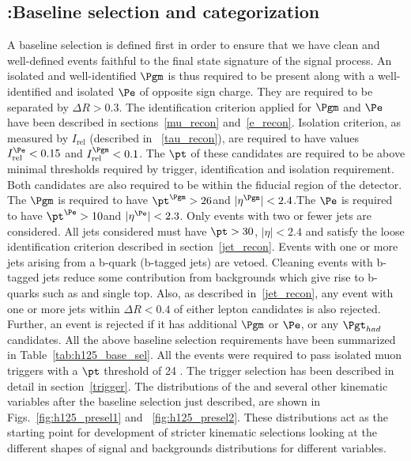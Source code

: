 \subsection{\hmue:Baseline selection and categorization}
\label{h125_presel_cat}
A baseline selection is defined first in order to ensure that we have clean and well-defined events faithful to the final state signature of the signal process. An isolated and well-identified $\Pgm$ is thus required to be present along with a well-identified and isolated $\Pe$ of opposite sign charge. They are required to be separated by $\Delta R > 0.3$. The identification criterion applied for $\Pgm$ and $\Pe$ have been described in sections~\ref{mu_recon} and~\ref{e_recon}. Isolation criterion, as measured by $I_\text{rel}$ (described in ~\ref{tau_recon}), are required to have values $I_\text{rel}^{\Pe} < 0.15$ and $I_\text{rel}^{\Pgm} < 0.1$. The $\pt$ of these candidates are required to be above minimal thresholds required by trigger, identification and isolation requirement. Both candidates are also required to be within the fiducial region of the detector. The $\Pgm$ is required to have $\pt^{\Pgm} > 26$\GeV and $|\eta^{\Pgm}|<2.4$.The $\Pe$ is required to have $\pt^{\Pe} > 10$\GeV and $|\eta^{\Pe}|<2.3$. Only events with two or fewer jets are considered. All jets considered must have $\pt>30$\GeV, $|\eta| < 2.4 $ and satisfy the loose identification criterion described in section~\ref{jet_recon}. Events with one or more jets arising from a b-quark (b-tagged jets) are vetoed. Cleaning events with b-tagged jets reduce some contribution from backgrounds which give rise to b-quarks such as \ttb and single top. Also, as described in~\ref{jet_recon}, any event with one or more jets within $\Delta R < 0.4$ of either lepton candidates is also rejected. Further, an event is rejected if it has additional $\Pgm$ or $\Pe$, or any $\Pgt_{had}$ candidates. All the above baseline selection requirements have been summarized in Table~\ref{tab:h125_base_sel}. All the events were required to pass isolated muon triggers with a $\pt$ threshold of 24 \GeV. The trigger selection has been described in detail in section~\ref{trigger}. The distributions of the \mcol and several other kinematic variables after the baseline selection just described, are shown in Figs.~\ref{fig:h125_presel1} and ~\ref{fig:h125_presel2}. These distributions act as the starting point for development of stricter kinematic selections looking at the different shapes of signal and backgrounds distributions for different variables.     


